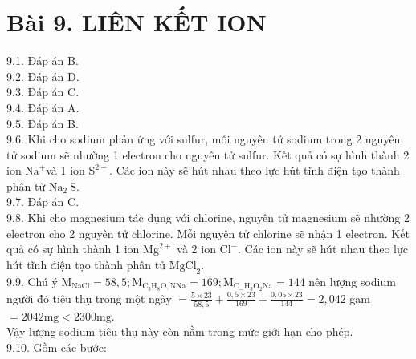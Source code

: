 \documentclass[10pt]{article}
\begin{document}
\section*{Bài 9. LIÊN KẾT ION}
9.1. Đáp án B.\\
9.2. Đáp án D.\\
9.3. Đáp án C.\\
9.4. Đáp án A.\\
9.5. Đáp án B.\\
9.6. Khi cho sodium phản ứng với sulfur, mỗi nguyên tử sodium trong 2 nguyên tử sodium sẽ nhường 1 electron cho nguyên tử sulfur. Kết quả có sự hình thành 2 ion $\mathrm{Na}^{+}$và 1 ion $\mathrm{S}^{2-}$. Các ion này sẽ hút nhau theo lực hút tĩnh điện tạo thành phân tử $\mathrm{Na}_{2} \mathrm{~S}$.\\
9.7. Đáp án C.\\
9.8. Khi cho magnesium tác dụng với chlorine, nguyên tử magnesium sẽ nhường 2 electron cho 2 nguyên tử chlorine. Mỗi nguyên tử chlorine sẽ nhận 1 electron. Kết quả có sự hình thành 1 ion $\mathrm{Mg}^{2+}$ và 2 ion $\mathrm{Cl}^{-}$. Các ion này sẽ hút nhau theo lực hút tĩnh điện tạo thành phân tử $\mathrm{MgCl}_{2}$.\\
9.9. Chú ý $\mathrm{M}_{\mathrm{NaCl}}=58,5 ; \mathrm{M}_{\mathrm{C}_{5} \mathrm{H}_{8} \mathrm{O}, \mathrm{NNa}}=169 ; \mathrm{M}_{\mathrm{C}_{-} \mathrm{H}_{5} \mathrm{O}_{2} \mathrm{Na}}=144$ nên lượng sodium người đó tiêu thụ trong một ngày $=\frac{5 \times 23}{58,5}+\frac{0,5 \times 23}{169}+\frac{0,05 \times 23}{144}=2,042$ gam $=2042 \mathrm{mg}<2300 \mathrm{mg}$.\\
Vậy lượng sodium tiêu thụ này còn nằm trong mức giới hạn cho phép.\\
9.10. Gồm các bước:
\end{document}
